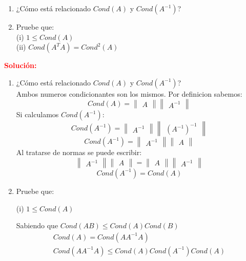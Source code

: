\begin{enumerate}[label=(\alph*)]
\item ¿Cómo está relacionado $Cond(A)$ y $Cond(A^{-1})$?
\item Pruebe que:\\
(i) $1 \leq Cond(A)$\\
(ii) $Cond(A^TA)=Cond^2(A)$
\end{enumerate}

\noindent \textcolor{red}{\bf Solución:}
\begin{enumerate}[label=(\alph*)]
    \item ¿Cómo está relacionado $Cond(A)$ y $Cond(A^{-1})$?\\
Ambos numeros condicionantes son los mismos. Por definicion sabemos:
$$Cond(A) =  \begin{Vmatrix} A \end{Vmatrix} \begin{Vmatrix} A^{-1} \end{Vmatrix}$$
Si calculamos $Cond(A^{-1})$:
$$Cond(A^{-1}) =  \begin{Vmatrix} A^{-1} \end{Vmatrix} \begin{Vmatrix} (A^{-1})^{-1} \end{Vmatrix}$$
$$Cond(A^{-1}) =  \begin{Vmatrix} A^{-1} \end{Vmatrix} \begin{Vmatrix} A \end{Vmatrix}$$
Al tratarse de normas se puede escribir:
$$\begin{Vmatrix} A^{-1} \end{Vmatrix} \begin{Vmatrix} A \end{Vmatrix} = \begin{Vmatrix} A \end{Vmatrix}\begin{Vmatrix} A^{-1} \end{Vmatrix}$$
$$Cond(A^{-1}) = Cond(A)$$

\item Pruebe que:

(i) $1 \leq Cond(A)$

Sabiendo que $Cond(AB) \leq Cond(A)Cond(B)$
\begin{gather*}
Cond(A)=Cond(AA^{-1}A) \\
Cond(AA^{-1}A) \leq Cond(A)Cond(A^{-1})Cond(A)
\end{gather*}


\end{enumerate}
